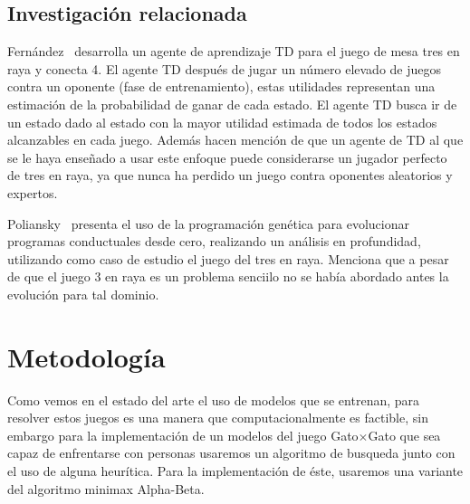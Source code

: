 \documentclass[runningheads]{llncs}
\begin{document}
\subsection{Investigación relacionada}
Fernández~\cite{ref_article0} desarrolla un agente de aprendizaje TD para el juego de mesa tres en raya y conecta 4. El agente TD después de jugar un número elevado de juegos contra un oponente (fase de entrenamiento), estas utilidades representan una estimación de la probabilidad de ganar de cada estado. El agente TD busca ir de un estado dado al estado con la mayor utilidad estimada de todos los estados alcanzables en cada juego. Además hacen mención de que un agente de TD al que se le haya enseñado a usar este enfoque puede considerarse un jugador perfecto de tres en raya, ya que nunca ha perdido un juego contra oponentes aleatorios y expertos.

Poliansky~\cite{ref_article1} presenta el uso de la programación genética para evolucionar programas conductuales desde cero, realizando un análisis en profundidad, utilizando como caso de estudio el juego del tres en raya. Menciona que a pesar de que el juego 3 en raya es un problema senciilo no se había abordado antes la evolución para tal dominio. 


\section{Metodología}
Como vemos en el estado del arte el uso de modelos que se entrenan, para resolver estos juegos es una manera que computacionalmente es factible, sin embargo para la implementación de un modelos del juego Gato$\times$Gato que sea capaz de enfrentarse con personas usaremos un algoritmo de busqueda junto con el uso de alguna heurítica. Para la implementación de éste, usaremos una variante del algoritmo minimax Alpha-Beta. 
\end{document}

